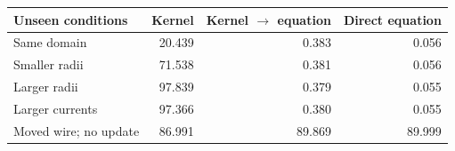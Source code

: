 \begin{tabular}{@{}lrrr@{}}
\toprule
Unseen conditions & Kernel & Kernel $\to$ equation & Direct equation \\
\midrule
Same domain & 20.439 & 0.383 & 0.056 \\
Smaller radii & 71.538 & 0.381 & 0.056 \\
Larger radii & 97.839 & 0.379 & 0.055 \\
Larger currents & 97.366 & 0.380 & 0.055 \\
Moved wire; no update & 86.991 & 89.869 & 89.999 \\
\bottomrule
\end{tabular}
